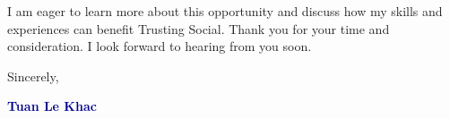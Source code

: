 \documentclass[11pt, letterpaper]{article}
\begin{document}
\vspace{0.1in}

I am eager to learn more about this opportunity and discuss how my skills and experiences can benefit Trusting Social. Thank you for your time and consideration. I look forward to hearing from you soon.

\vspace{0.2in}

Sincerely,
\vspace{0.1in}

\textbf{\textcolor{darkblue}{Tuan Le Khac}}
\end{document}
